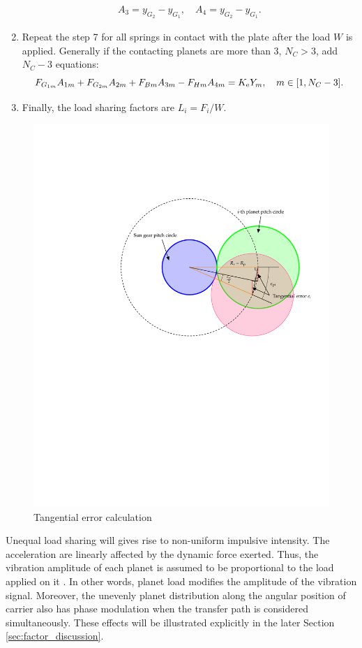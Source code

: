\documentclass[a4paper,fleqn]{cas-sc}%
\begin{document}
\begin{enumerate}
\begin{equation}
\begin{split}
            A_3=y_{G_2}-y_{G_1},\quad A_4=y_{G_2}-y_{G_1}.
        \end{split}
    \end{equation}
    \item Repeat the step 7 for all springs in contact with the plate after the load $W$ is applied. Generally if the contacting planets are more than 3, $N_C>3$, add $N_C-3$ equations:
    \begin{equation}
        F_{G_{1m}}A_{1m}+F_{G_{2m}}A_{2m}+F_{Bm}A_{3m}-F_{Hm}A_{4m}=K_{\rm e}Y_m,\quad m\in[1,N_C-3].
    \end{equation}
    \item Finally, the load sharing factors are $L_i=F_i/W$.
\end{enumerate}
\begin{figure}[pos=htbp]
    \centering
    \includegraphics[scale=0.5]{tangential_error}
    \caption{Tangential error calculation}
    \label{fig:tangential_error}
\end{figure}
\par Unequal load sharing will gives rise to non-uniform impulsive intensity. The acceleration are linearly affected by the dynamic force exerted. Thus, the vibration amplitude of each planet is assumed to be proportional to the load applied on it \cite{Inalpolat2009}. In other words, planet load modifies the amplitude of the vibration signal. Moreover, the unevenly planet distribution along the angular position of carrier also has phase modulation when the transfer path is considered simultaneously. These effects will be illustrated explicitly in the later Section \ref{sec:factor_discussion}. 
\end{document}
